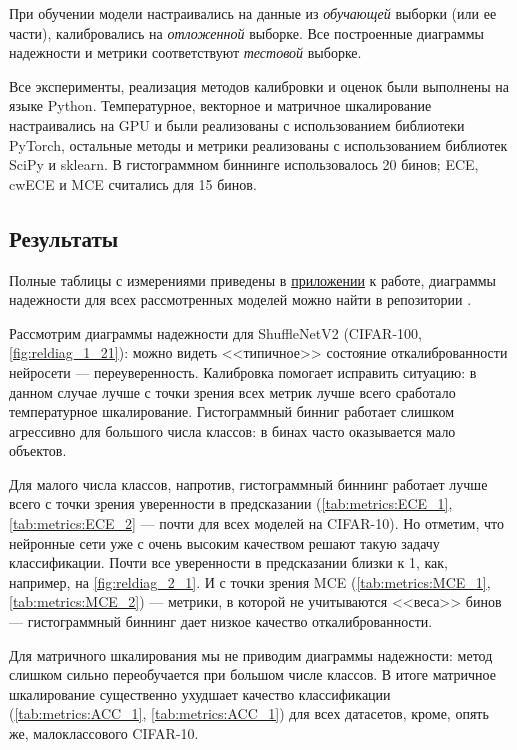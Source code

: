 \documentclass[12pt]{article}
\begin{document}
При обучении модели настраивались на данные из \emph{обучающей} выборки (или ее части), калибровались на \emph{отложенной} выборке. Все построенные диаграммы надежности и метрики соответствуют \emph{тестовой} выборке.

Все эксперименты, реализация методов калибровки и оценок были выполнены на языке Python. Температурное, векторное и матричное шкалирование настраивались на GPU и были реализованы с использованием библиотеки PyTorch, остальные методы и метрики реализованы с использованием библиотек SciPy и sklearn. В гистограммном биннинге использовалось 20 бинов; ECE, cwECE и MCE считались для 15 бинов.

\subsection{Результаты}
Полные таблицы с измерениями приведены в 
\hyperref[sec:appendix]{приложении} к работе, диаграммы надежности для всех рассмотренных моделей можно найти в репозитории \cite{my_repo}.

Рассмотрим диаграммы надежности для ShuffleNetV2 (CIFAR-100, \autoref{fig:reldiag_1_21}): можно видеть <<типичное>> состояние откалиброванности нейросети --- переуверенность. Калибровка помогает исправить ситуацию: в данном случае лучше с точки зрения всех метрик лучше всего сработало температурное шкалирование. Гистограммный бинниг работает слишком агрессивно для большого числа классов: в бинах часто оказывается мало объектов.

Для малого числа классов, напротив, гистограммный биннинг работает лучше всего с точки зрения уверенности в предсказании (\autoref{tab:metrics:ECE_1}, \autoref{tab:metrics:ECE_2} --- почти для всех моделей на CIFAR-10). Но отметим, что нейронные сети уже с очень высоким качеством решают такую задачу классификации. Почти все уверенности в предсказании близки к 1, как, например, на \autoref{fig:reldiag_2_1}. И с точки зрения MCE (\autoref{tab:metrics:MCE_1}, \autoref{tab:metrics:MCE_2}) --- метрики, в которой не учитываются <<веса>> бинов --- гистограммный биннинг дает низкое качество откалиброванности.

Для матричного шкалирования мы не приводим диаграммы надежности: метод слишком сильно переобучается при большом числе классов. В итоге матричное шкалирование существенно ухудшает качество классификации (\autoref{tab:metrics:ACC_1}, \autoref{tab:metrics:ACC_1}) для всех датасетов, кроме, опять же, малоклассового CIFAR-10.
\end{document}
